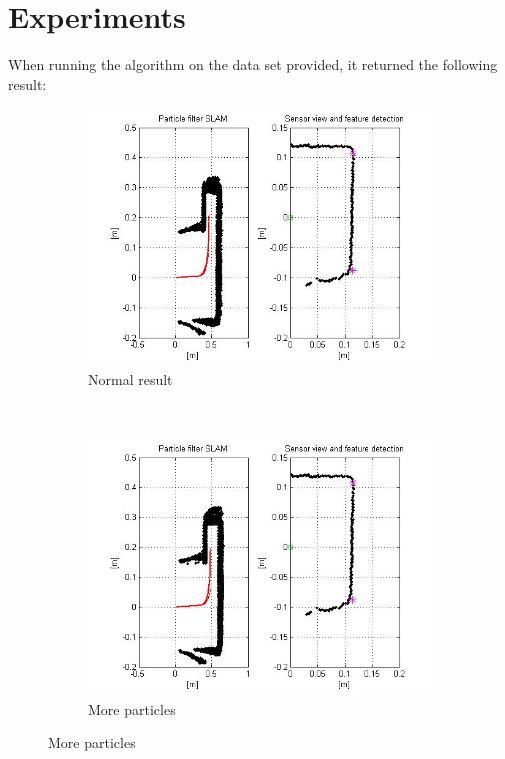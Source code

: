 \documentclass[12pt]{article}
\begin{document}
\section{Experiments}
When running the algorithm on the data set provided, it returned the following result:
\begin{figure}[H]
	\centering
	\begin{subfigure}[b]{0.48\textwidth}
		\includegraphics[width=\textwidth]{normal.jpg}
		\caption{Normal result}
		\label{norm}
	\end{subfigure}
	~
	\begin{subfigure}[b]{0.48\textwidth}
		\includegraphics[width=\textwidth]{1000particles.jpg}
		\caption{More particles}
		\label{more}

\end{subfigure}
\end{figure}
\end{document}
